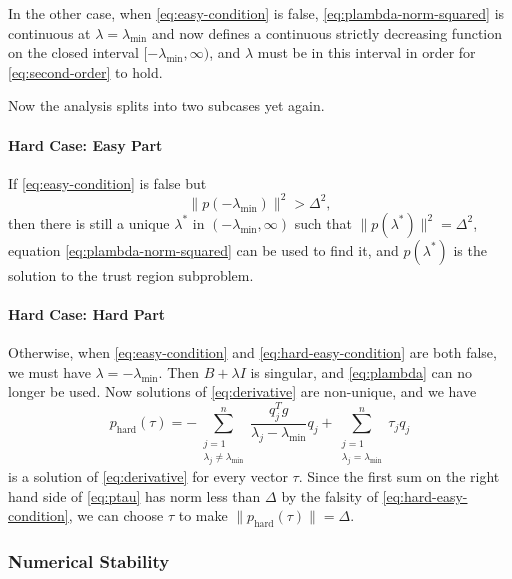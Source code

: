 \documentclass[11pt]{article}
\begin{document}
In the other case, when \eqref{eq:easy-condition} is false,
\eqref{eq:plambda-norm-squared} is continuous
at $\lambda = \lambda_{\text{min}}$ and now 
defines a continuous
strictly decreasing function on
the closed interval $[- \lambda_{\text{min}}, \infty)$, and $\lambda$
must be in this interval in order for \eqref{eq:second-order} to hold.

Now the analysis splits into two subcases yet again.

\paragraph{Hard Case: Easy Part}

If \eqref{eq:easy-condition} is false but
\begin{equation} \label{eq:hard-easy-condition}
   \lVert p(- \lambda_{\text{min}}) \rVert^2 > \Delta^2,
\end{equation}
then there is still a unique $\lambda^*$ in $(- \lambda_{\text{min}}, \infty)$
such that $\lVert p(\lambda^*) \rVert^2 = \Delta^2$,
equation \eqref{eq:plambda-norm-squared} can be used to find it,
and $p(\lambda^*)$ is the
solution to the trust region subproblem.

\paragraph{Hard Case: Hard Part}

Otherwise, when \eqref{eq:easy-condition} and \eqref{eq:hard-easy-condition}
are both false,
we must have $\lambda = - \lambda_{\text{min}}$.
Then $B + \lambda I$ is singular, and \eqref{eq:plambda}
can no longer be used.  Now solutions of \eqref{eq:derivative}
are non-unique, and we have
\begin{equation} \label{eq:ptau}
   p_{\text{hard}}(\tau)
   =
   - \sum_{\substack{j = 1 \\ \lambda_j \neq \lambda_{\text{min}}}}^n
   \frac{q_j^T g}{\lambda_j - \lambda_{\text{min}}} q_j
   +
   \sum_{\substack{j = 1 \\ \lambda_j = \lambda_{\text{min}}}}^n
   \tau_j q_j
\end{equation}
is a solution of \eqref{eq:derivative} for every vector $\tau$.
Since the first sum on the right hand side of \eqref{eq:ptau} has
norm less than $\Delta$ by the falsity of \eqref{eq:hard-easy-condition},
we can choose $\tau$ to make $\lVert p_{\text{hard}}(\tau) \rVert = \Delta$.

\subsubsection{Numerical Stability}
\end{document}
